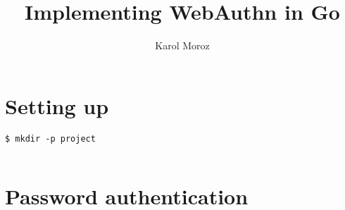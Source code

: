 \documentclass[b5paper,12pt]{book}
\title{Implementing WebAuthn in Go}
\author{Karol Moroz}
\begin{document}
\maketitle
\chapter{Setting up}

\begin{verbatim}
$ mkdir -p project
\end{verbatim}

\inputminted[tabsize=4]{go}{code/01-setting-up/01-main.go}

\chapter{Password authentication}
\end{document}
